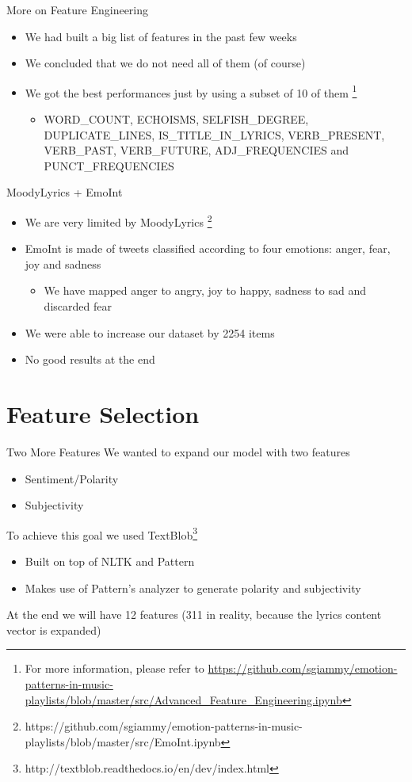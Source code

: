 \documentclass[xcolor=dvipsnames]{beamer}
\begin{document}
\begin{frame}{More on Feature Engineering}
\begin{itemize}
\item We had built a big list of features in the past few weeks
\item We concluded that we do not need all of them (of course)
\item We got the best performances just by using a subset of 10 of them
	\footnote{For more information, please refer to \url{https://github.com/sgiammy/emotion-patterns-in-music-playlists/blob/master/src/Advanced_Feature_Engineering.ipynb}}
	\begin{itemize}
	\item WORD\_COUNT, ECHOISMS, SELFISH\_DEGREE, DUPLICATE\_LINES, IS\_TITLE\_IN\_LYRICS, VERB\_PRESENT, VERB\_PAST, VERB\_FUTURE, ADJ\_FREQUENCIES and PUNCT\_FREQUENCIES
	\end{itemize}
\end{itemize}
\end{frame}

\begin{frame}{MoodyLyrics + EmoInt}
\begin{itemize}
\item We are very limited by MoodyLyrics
	\footnote{https://github.com/sgiammy/emotion-patterns-in-music-playlists/blob/master/src/EmoInt.ipynb}
\item EmoInt is made of tweets classified according to four emotions: anger, fear, joy and sadness
	\begin{itemize}
	\item We have mapped anger to angry, joy to happy, sadness to sad and discarded fear
	\end{itemize}
\item We were able to increase our dataset by 2254 items
\item No good results at the end
\end{itemize}
\end{frame}

\section{Feature Selection}

\begin{frame}{Two More Features}
We wanted to expand our model with two features
\begin{itemize}
\item Sentiment/Polarity
\item Subjectivity
\end{itemize}
To achieve this goal we used TextBlob\footnote{http://textblob.readthedocs.io/en/dev/index.html}
\begin{itemize}
\item Built on top of NLTK and Pattern
\item Makes use of Pattern's analyzer to generate polarity and subjectivity
\end{itemize}
At the end we will have 12 features (311 in reality, because the lyrics content vector is expanded)
\end{frame}
\end{document}
